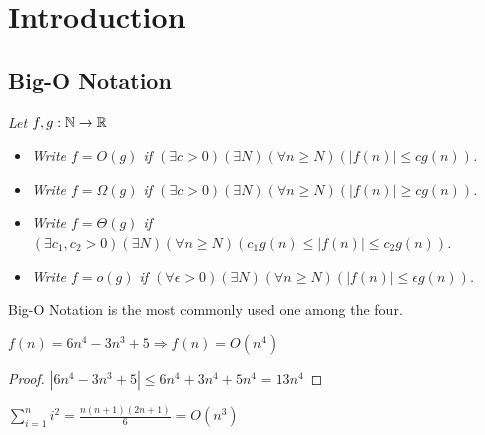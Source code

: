 \documentclass{article}
\begin{document}
\else
\fi
\newpage
\section{Introduction}
\subsection{Big-O Notation}

\begin{defn}
    \textit{Let $f,g:\mathbb{N} \rightarrow \mathbb{R}$}
    \begin{itemize}
        \item \textit{Write $f = O(g)$ if $(\exists c > 0)(\exists N)(\forall n \geq N)(|f(n)| \leq cg(n))$.}
        \item \textit{Write $f = \Omega(g)$ if $(\exists c > 0)(\exists N)(\forall n \geq N)(|f(n)| \geq cg(n))$.}
        \item \textit{Write $f = \Theta(g)$ if $(\exists c_1, c_2 > 0)(\exists N)(\forall n \geq N)(c_1g(n) \leq |f(n)| \leq c_2g(n))$.}
        \item \textit{Write $f = o(g)$ if $(\forall \epsilon > 0)(\exists N)(\forall n \geq N)(|f(n)| \leq \epsilon g(n))$.}
    \end{itemize}

    Big-O Notation is the most commonly used one among the four.
\end{defn}


\begin{example}
    $f(n) = 6n^4-3n^3+5 \Rightarrow f(n) = O(n^4)$
\end{example}

\begin{proof}
    $|6n^4-3n^3+5|\leq 6n^4+3n^4+5n^4=13n^4$
\end{proof}


\begin{example}
    $\sum\limits_{i=1}^{n} i^2=\frac{n(n+1)(2n+1)}{6} = O(n^3)$
\end{example}
  
\end{document}

